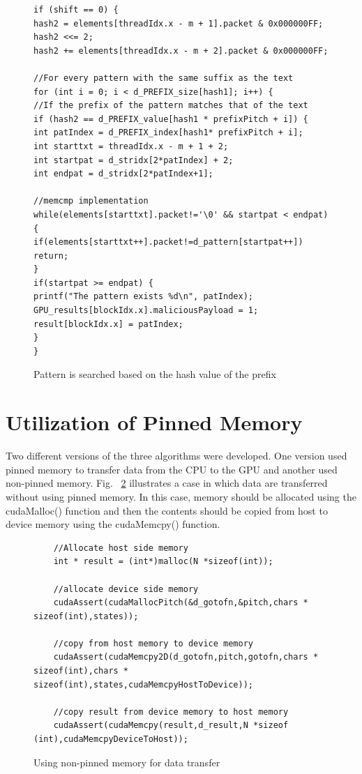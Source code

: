 \begin{figure}[H]
	\begin{lstlisting}
if (shift == 0) {
hash2 = elements[threadIdx.x - m + 1].packet & 0x000000FF;
hash2 <<= 2;
hash2 += elements[threadIdx.x - m + 2].packet & 0x000000FF;

//For every pattern with the same suffix as the text
for (int i = 0; i < d_PREFIX_size[hash1]; i++) {	
//If the prefix of the pattern matches that of the text
if (hash2 == d_PREFIX_value[hash1 * prefixPitch + i]) {
int patIndex = d_PREFIX_index[hash1* prefixPitch + i];
int starttxt = threadIdx.x - m + 1 + 2;
int startpat = d_stridx[2*patIndex] + 2;
int endpat = d_stridx[2*patIndex+1];

//memcmp implementation
while(elements[starttxt].packet!='\0' && startpat < endpat) {
if(elements[starttxt++].packet!=d_pattern[startpat++]) return;
}
if(startpat >= endpat) { 
printf("The pattern exists %d\n", patIndex);
GPU_results[blockIdx.x].maliciousPayload = 1;
result[blockIdx.x] = patIndex;
}
}
	\end{lstlisting}
	\caption{Pattern is searched based on the hash value of the prefix}
	\label{fig:wumanstep2}
\end{figure}
\squeezeup

\section{Utilization of Pinned Memory}
Two different versions of the three algorithms were developed. One version used pinned memory to transfer data from the CPU to the GPU and another used non-pinned memory. Fig. ~\ref{fig:nonpinnedmemory} illustrates a case in which data are transferred without using pinned memory. In this case, memory should be allocated using the cudaMalloc() function and then the contents should be copied from host to device memory using the cudaMemcpy() function. 

\begin{figure}[H]
	\begin{lstlisting}
	//Allocate host side memory
	int * result = (int*)malloc(N *sizeof(int));
	
	//allocate device side memory
	cudaAssert(cudaMallocPitch(&d_gotofn,&pitch,chars * sizeof(int),states));
	
	//copy from host memory to device memory
	cudaAssert(cudaMemcpy2D(d_gotofn,pitch,gotofn,chars * sizeof(int),chars * sizeof(int),states,cudaMemcpyHostToDevice));
	
	//copy result from device memory to host memory
	cudaAssert(cudaMemcpy(result,d_result,N *sizeof (int),cudaMemcpyDeviceToHost));
	\end{lstlisting}
	\caption{Using non-pinned memory for data transfer}
	\label{fig:nonpinnedmemory}
\end{figure}
\squeezeup

